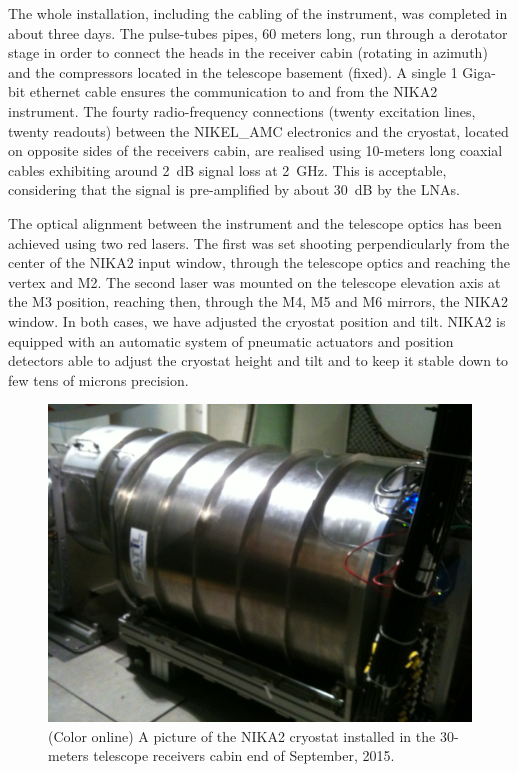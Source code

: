 \documentclass[]{aa} %
\begin{document}
The whole installation, including the cabling of the instrument, was completed in about three days. The pulse-tubes pipes, 60 meters long, run through a derotator stage in order to connect the heads in the receiver cabin (rotating in azimuth) and the compressors located in the telescope basement (fixed). A single 1 Giga-bit ethernet cable ensures the communication to and from the NIKA2 instrument. The fourty radio-frequency connections (twenty excitation lines, twenty readouts) between the NIKEL\_AMC electronics and the cryostat, located on opposite sides of the receivers cabin, are realised using 10-meters long coaxial cables exhibiting around 2~dB signal loss at 2~GHz. This is acceptable, considering that the signal is pre-amplified by about 30~dB by the LNAs. 

The optical alignment between the instrument and the telescope optics has been achieved using two red lasers. The first was set shooting perpendicularly from the center of the NIKA2 input window, through the telescope optics and reaching the vertex and M2. The second laser was mounted on the telescope elevation axis at the M3 position, reaching then, through the M4, M5 and M6 mirrors, the NIKA2 window. In both cases, we have adjusted the cryostat position and tilt. NIKA2 is equipped with an automatic system of pneumatic actuators and position detectors able to adjust the cryostat height and tilt and to keep it stable down to few tens of microns precision. 

\begin{figure}[h]
   \centering
    \includegraphics[width=.85\linewidth]{NIKA2cryo.jpg}
      \caption{(Color online) A picture of the NIKA2 cryostat installed in the 30-meters telescope receivers cabin end of September, 2015.}
         \label{Fig5}
\end{figure}
\end{document}
